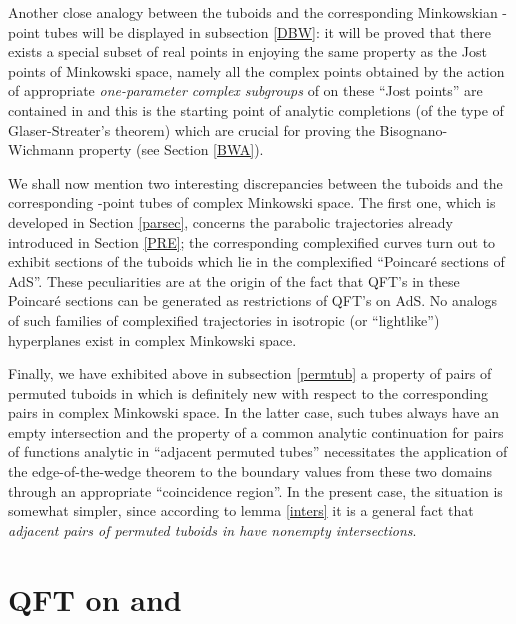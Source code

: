 \documentclass[a4paper,a4paper]{article}
\let\UnmodifSec=\section
\renewcommand{\section}{\setcounter{equation}{0}\UnmodifSec}
\def\ZZ{{\cal Z}}
\def\wt{\widetilde}
\begin{document}
\vskip 0.2cm
Another close analogy between the tuboids \myHighlight{$\ZZ_{n\pm}$}\coordHE{} and
the corresponding Minkow\-skian \coordHE{}-point tubes will be displayed
in subsection \ref{DBW}: it will be proved that there exists
a special subset of real points in \coordHE{} enjoying the same property
as the Jost points of Minkowski space, namely all the complex points
obtained by the action of appropriate {\sl one-parameter complex subgroups}
of \coordHE{} on these ``Jost points'' are  contained in
\myHighlight{$\ZZ_{n+}
\cup \ZZ_{n-}$}\coordHE{} and this is the starting point of analytic completions
(of the type of Glaser-Streater's theorem) which are crucial for
proving the Bisognano-Wichmann property (see Section \ref{BWA}).

\vskip 0.3cm
We shall now mention two interesting discrepancies between the
tuboids \myHighlight{$\ZZ_{n+}$}\coordHE{} and the corresponding \coordHE{}-point tubes of
complex Minkowski space.
The first one, which is developed in Section \ref{parsec},
concerns the parabolic trajectories already introduced in Section
\ref{PRE}; the corresponding complexified curves
turn out to exhibit sections of the
tuboids \myHighlight{$\ZZ_{n+}$}\coordHE{} which lie in
the complexified ``Poincar\'e sections of AdS''.
These peculiarities are at the origin of the fact that
QFT's in these Poincar\'e sections can be generated as
restrictions of QFT's on AdS.
No analogs of such families of complexified trajectories
in isotropic (or ``lightlike'')
hyperplanes exist in complex Minkowski space.

\vskip 0.2cm
Finally, we have exhibited above in subsection \ref{permtub}
a property of pairs of permuted tuboids in \coordHE{} which is definitely
new with respect to the corresponding pairs in complex Minkowski space.
In the latter case, such tubes always have an empty intersection
and the property of a common analytic continuation
for pairs of functions analytic in ``adjacent permuted
tubes''
necessitates the application of the edge-of-the-wedge theorem
to the
boundary values from these two domains
through an appropriate ``coincidence region''.
In the present case, the situation is somewhat simpler,
since according to lemma \ref{inters}
it is a general fact that {\sl adjacent pairs of permuted tuboids in
\coordHE{} have nonempty intersections}.

\section{QFT on \coordHE{} and \myHighlight{$\wt X_d$}\coordHE{}}
\end{document}
